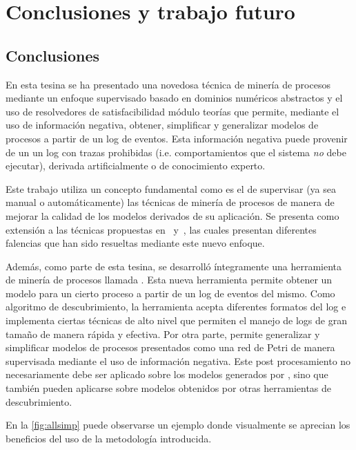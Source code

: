 \chapter{Conclusiones y trabajo futuro}
\label{chap:5}

\section*{Conclusiones}

En esta tesina se ha presentado una novedosa técnica de minería de procesos mediante un enfoque
supervisado basado en dominios numéricos abstractos y el uso de resolvedores de satisfacibilidad 
módulo teorías que permite, mediante el uso de información negativa, obtener, simplificar y
generalizar modelos de procesos a partir de un log de eventos. Esta información negativa puede provenir 
de un un log con trazas prohibidas (i.e. comportamientos que el sistema \emph{no} debe ejecutar),
derivada artificialmente o de conocimiento experto.

Este trabajo utiliza un concepto fundamental como es el de supervisar (ya sea manual o automáticamente)
las técnicas de minería de procesos de manera de mejorar la calidad de los modelos derivados de
su aplicación. Se presenta como extensión a las técnicas propuestas en~\cite{CarmonaC14}
y~\cite{LeonCB15}, las cuales presentan diferentes falencias que han sido resueltas mediante
este nuevo enfoque.

Además, como parte de esta tesina, se desarrolló íntegramente una herramienta de
minería de procesos llamada \pachtool.
Esta nueva herramienta%
permite obtener un modelo para un cierto proceso a partir de un log de eventos del mismo.
Como algoritmo de descubrimiento, la herramienta acepta diferentes formatos del log 
e implementa ciertas técnicas de alto nivel que permiten el manejo de logs de gran 
tamaño de manera rápida y efectiva.
Por otra parte, \pachtool permite generalizar y simplificar modelos de procesos presentados como
una red de Petri de manera supervisada mediante el uso de información negativa. Este 
post procesamiento no necesariamente debe ser aplicado sobre los modelos generados por \pachtool,
sino que también pueden aplicarse sobre modelos obtenidos por otras herramientas de descubrimiento.

En la \autoref{fig:allsimp} puede observarse un ejemplo donde visualmente se aprecian los beneficios del
uso de la metodología introducida.

